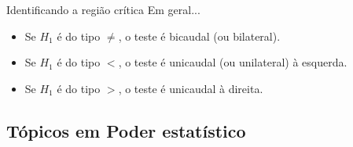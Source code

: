 \documentclass{beamer}
\begin{document}

\begin{frame}{\scriptsize Identificando a região crítica}
  \footnotesize
  Em geral...
  \bigskip
  \bigskip
  \bigskip
  \begin{itemize}
  \item Se $H_1$ é do tipo $\ne$, o teste é bicaudal (ou bilateral).
    \medskip
  \item Se $H_1$ é do tipo $<$, o teste é unicaudal (ou unilateral) à esquerda.
    \medskip
  \item Se $H_1$ é do tipo $>$, o teste é unicaudal à direita.
  \end{itemize}
\end{frame}

\subsection[Poder]{Tópicos em Poder estatístico}
\end{document}
